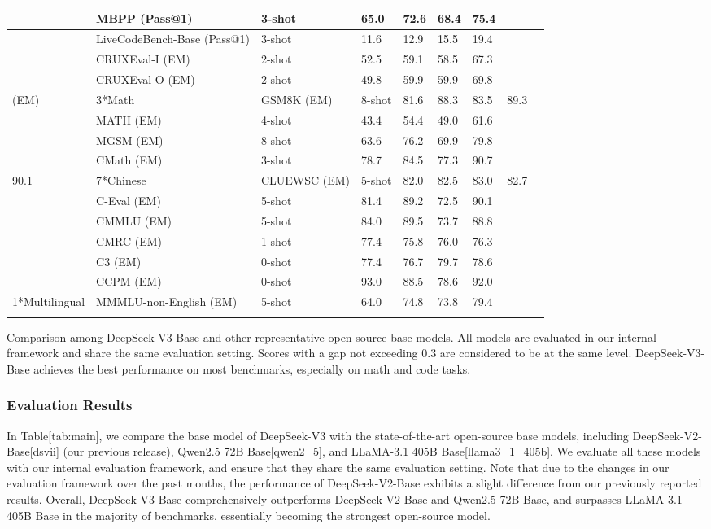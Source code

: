 \documentclass[11pt,a4paper]{article}
\begin{document}
\begin{table}[h]
\begin{tabular}{|l|l|l|l|l|l|l|l|l|}
 & MBPP (Pass@1) & 3-shot & 65.0 & 72.6 & 68.4 & 75.4 &  &  \\ \hline
 & LiveCodeBench-Base (Pass@1) & 3-shot & 11.6 & 12.9 & 15.5 & 19.4 &  &  \\ \hline
 & CRUXEval-I (EM) & 2-shot & 52.5 & 59.1 & 58.5 & 67.3 &  &  \\ \hline
 & CRUXEval-O (EM) & 2-shot & 49.8 & 59.9 & 59.9 & 69.8 &  &  \\ \hline
(EM) & 3*Math & GSM8K (EM) & 8-shot & 81.6 & 88.3 & 83.5 & 89.3 &  \\ \hline
 & MATH (EM) & 4-shot & 43.4 & 54.4 & 49.0 & 61.6 &  &  \\ \hline
 & MGSM (EM) & 8-shot & 63.6 & 76.2 & 69.9 & 79.8 &  &  \\ \hline
 & CMath (EM) & 3-shot & 78.7 & 84.5 & 77.3 & 90.7 &  &  \\ \hline
90.1 & 7*Chinese & CLUEWSC (EM) & 5-shot & 82.0 & 82.5 & 83.0 & 82.7 &  \\ \hline
 & C-Eval (EM) & 5-shot & 81.4 & 89.2 & 72.5 & 90.1 &  &  \\ \hline
 & CMMLU (EM) & 5-shot & 84.0 & 89.5 & 73.7 & 88.8 &  &  \\ \hline
 & CMRC (EM) & 1-shot & 77.4 & 75.8 & 76.0 & 76.3 &  &  \\ \hline
 & C3 (EM) & 0-shot & 77.4 & 76.7 & 79.7 & 78.6 &  &  \\ \hline
 & CCPM (EM) & 0-shot & 93.0 & 88.5 & 78.6 & 92.0 &  &  \\ \hline
1*Multilingual & MMMLU-non-English (EM) & 5-shot & 64.0 & 74.8 & 73.8 & 79.4 &  &  \\ \hline
 &  &  &  &  &  &  &  &  \\ \hline
\end{tabular}
\end{table}

Comparison among DeepSeek-V3-Base and other representative open-source base models.
 All models are evaluated in our internal framework and share the same evaluation setting.
 Scores with a gap not exceeding 0.3 are considered to be at the same level. 
 DeepSeek-V3-Base achieves the best performance on most benchmarks, especially on math and code tasks.

\subsubsection{Evaluation Results}

In Table[tab:main], we compare the base model of DeepSeek-V3 with the state-of-the-art open-source base models, including DeepSeek-V2-Base[dsvii] (our previous release), Qwen2.5 72B Base[qwen2\_5], and LLaMA-3.1 405B Base[llama3\_1\_405b].
We evaluate all these models with our internal evaluation framework, and ensure that they share the same evaluation setting. 
Note that due to the changes in our evaluation framework over the past months, the performance of DeepSeek-V2-Base exhibits a slight difference from our previously reported results.
Overall, DeepSeek-V3-Base comprehensively outperforms DeepSeek-V2-Base and Qwen2.5 72B Base, and surpasses LLaMA-3.1 405B Base in the majority of benchmarks, essentially becoming the strongest open-source model.
\end{document}
